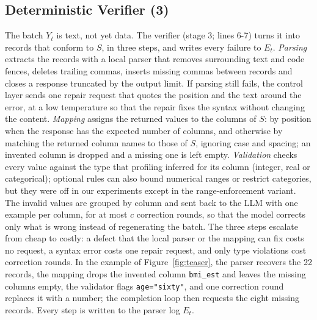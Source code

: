 \documentclass[conference]{IEEEtran}
\begin{document}
\subsection{Deterministic Verifier (3)}
The batch $Y_t$ is text, not yet data. The verifier (stage 3; lines 6-7) turns it into records that conform to $S$, in three steps, and writes every failure to $E_t$. \emph{Parsing} extracts the records with a local parser that removes surrounding text and code fences, deletes trailing commas, inserts missing commas between records and closes a response truncated by the output limit. If parsing still fails, the control layer sends one repair request that quotes the position and the text around the error, at a low temperature so that the repair fixes the syntax without changing the content. \emph{Mapping} assigns the returned values to the columns of $S$: by position when the response has the expected number of columns, and otherwise by matching the returned column names to those of $S$, ignoring case and spacing; an invented column is dropped and a missing one is left empty. \emph{Validation} checks every value against the type that profiling inferred for its column (integer, real or categorical); optional rules can also bound numerical ranges or restrict categories, but they were off in our experiments except in the range-enforcement variant. The invalid values are grouped by column and sent back to the LLM with one example per column, for at most $c$ correction rounds, so that the model corrects only what is wrong instead of regenerating the batch. The three steps escalate from cheap to costly: a defect that the local parser or the mapping can fix costs no request, a syntax error costs one repair request, and only type violations cost correction rounds. In the example of Figure~\ref{fig:teaser}, the parser recovers the 22 records, the mapping drops the invented column \texttt{bmi\_est} and leaves the missing columns empty, the validator flags \texttt{age="sixty"}, and one correction round replaces it with a number; the completion loop then requests the eight missing records. Every step is written to the parser log $E_t$.
\end{document}
